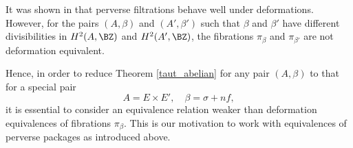 \begin{rmk}
\notready\label{remark2.8}
It was shown in \cite{dCM} that perverse filtrations behave well under deformations. However, for the pairs $(A, \beta)$ and $(A',\beta')$ such that $\beta$ and $\beta'$ have different divisibilities in $H^2(A, \BZ)$ and $H^2(A',\BZ)$, the fibrations $\pi_\beta$ and $\pi_{\beta'}$ are not deformation equivalent.

Hence, in order to reduce Theorem \ref{taut_abelian} for any pair $(A,\beta)$ to that for a special pair
\[
A= E \times E', \quad \beta = \sigma +n f,
\]
it is essential to consider an equivalence relation weaker than deformation equivalences of fibrations $\pi_\beta$. This is our motivation to work with equivalences of perverse packages as introduced above.
\end{rmk}

